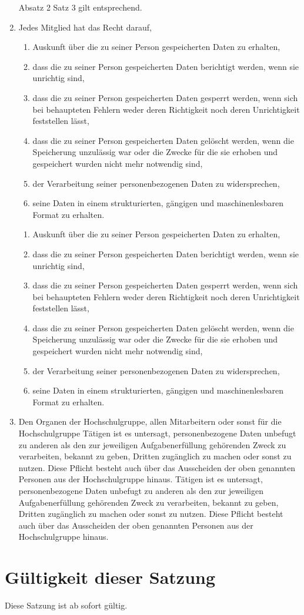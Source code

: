\documentclass[11pt]{article}
\begin{document}
\begin{enumerate}
	      Absatz 2 Satz 3 gilt entsprechend.
	\item Jedes Mitglied hat das Recht darauf,
	      \begin{enumerate}
		      \item Auskunft über die zu seiner Person gespeicherten Daten zu erhalten,
		      \item dass die zu seiner Person gespeicherten Daten berichtigt werden, wenn sie unrichtig sind,
		      \item dass die zu seiner Person gespeicherten Daten gesperrt werden, wenn sich bei behaupteten
		            Fehlern weder deren Richtigkeit noch deren Unrichtigkeit feststellen lässt,
		      \item dass die zu seiner Person gespeicherten Daten gelöscht werden, wenn die Speicherung
		            unzulässig war oder die Zwecke für die sie erhoben und gespeichert wurden nicht mehr
		            notwendig sind,
		      \item der Verarbeitung seiner personenbezogenen Daten zu widersprechen,
		      \item seine Daten in einem strukturierten, gängigen und maschinenlesbaren Format zu erhalten.
	      \end{enumerate}
	      \begin{enumerate}
		      \item Auskunft über die zu seiner Person gespeicherten Daten zu erhalten,
		      \item dass die zu seiner Person gespeicherten Daten berichtigt werden, wenn sie unrichtig sind,
		      \item dass die zu seiner Person gespeicherten Daten gesperrt werden, wenn sich bei behaupteten
		            Fehlern weder deren Richtigkeit noch deren Unrichtigkeit feststellen lässt,
		      \item dass die zu seiner Person gespeicherten Daten gelöscht werden, wenn die Speicherung
		            unzulässig war oder die Zwecke für die sie erhoben und gespeichert wurden nicht mehr
		            notwendig sind,
		      \item der Verarbeitung seiner personenbezogenen Daten zu widersprechen,
		      \item seine Daten in einem strukturierten, gängigen und maschinenlesbaren Format zu erhalten.
	      \end{enumerate}
	\item Den Organen der Hochschulgruppe, allen Mitarbeitern oder sonst für die Hochschulgruppe
	      Tätigen ist es untersagt, personenbezogene Daten unbefugt zu anderen als den zur jeweiligen
	      Aufgabenerfüllung gehörenden Zweck zu verarbeiten, bekannt zu geben, Dritten zugänglich zu
	      machen oder sonst zu nutzen. Diese Pflicht besteht auch über das Ausscheiden der oben
	      genannten Personen aus der Hochschulgruppe hinaus.
	      Tätigen ist es untersagt, personenbezogene Daten unbefugt zu anderen als den zur jeweiligen
	      Aufgabenerfüllung gehörenden Zweck zu verarbeiten, bekannt zu geben, Dritten zugänglich zu
	      machen oder sonst zu nutzen. Diese Pflicht besteht auch über das Ausscheiden der oben
	      genannten Personen aus der Hochschulgruppe hinaus.
\end{enumerate}
\section{Gültigkeit dieser Satzung}
Diese Satzung ist ab sofort gültig.
\end{document}
